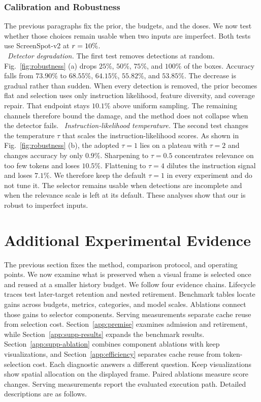 \subsubsection{Calibration and Robustness}
The previous paragraphs fix the prior, the budgets, and the doses.
%
We now test whether those choices remain usable when two inputs are imperfect.
%
Both tests use ScreenSpot-v2 at $r=10\%$.
\\
\noindent{}~\textit{Detector degradation.}
The first test removes detections at random.
%
Fig.~\ref{fig:robustness} (a) drops $25\%$, $50\%$, $75\%$, and $100\%$ of the boxes.
%
Accuracy falls from $73.90\%$ to $68.55\%$, $64.15\%$, $55.82\%$, and $53.85\%$.
%
The decrease is gradual rather than sudden.
%
When every detection is removed, the prior becomes flat and selection uses only instruction likelihood, feature diversity, and coverage repair.
%
That endpoint stays $10.1\%$ above uniform sampling.
%
The remaining channels therefore bound the damage, and the method does not collapse when the detector fails.
%
\noindent{}~\textit{Instruction-likelihood temperature.}
The second test changes the temperature $\tau$ that scales the instruction-likelihood scores.
%
As shown in Fig.~\ref{fig:robustness} (b), the adopted $\tau=1$ lies on a plateau with $\tau=2$ and changes accuracy by only $0.9\%$.
%
Sharpening to $\tau=0.5$ concentrates relevance on too few tokens and loses $10.5\%$.
%
Flattening to $\tau=4$ dilutes the instruction signal and loses $7.1\%$.
%
We therefore keep the default $\tau=1$ in every experiment and do not tune it.
%
The selector remains usable when detections are incomplete and when the relevance scale is left at its default.
%
These analyses show that our \method{} is robust to imperfect inputs.
\section{Additional Experimental Evidence}
\label{app:evidence}
The previous section fixes the method, comparison protocol, and operating points. We now examine what is preserved when a visual frame is selected once and reused at a smaller history budget.
%
We follow four evidence chains. Lifecycle traces test later-target retention and nested retirement. Benchmark tables locate gains across budgets, metrics, categories, and model scales. Ablations connect those gains to selector components. Serving measurements separate cache reuse from selection cost.
%
Section~\ref{app:premise} examines admission and retirement, while Section~\ref{app:supp-results} expands the benchmark results.
%
Section~\ref{app:supp-ablation} combines component ablations with keep visualizations, and Section~\ref{app:efficiency} separates cache reuse from token-selection cost.
%
Each diagnostic answers a different question. Keep visualizations show spatial allocation on the displayed frame. Paired ablations measure score changes. Serving measurements report the evaluated execution path.
%
Detailed descriptions are as follows.
